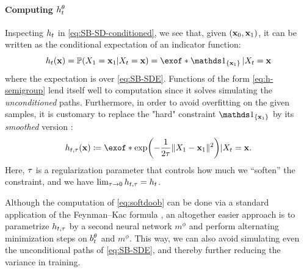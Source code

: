 \paragraph{Computing $h_t^\theta$}%

Inspecting $h_t$ in \eqref{eq:SB-SD-conditioned}, we see that, given $(\mathbf{x}_0,\mathbf{x}_1)$, it can be written as the conditional expectation of an indicator function:
\begin{equation}
\label{eq:h-semigroup}
\doob(\x) = \prob(X_1 = \x_1\vert X_t = \x) = \exof*{
\one_{\{\x_1\}}\vert X_t = \x}
\end{equation}where the expectation is over \eqref{eq:SB-SDE}. Functions of the form \eqref{eq:h-semigroup} lend itself well to computation since it solves simulating the \emph{unconditioned} paths.
Furthermore, in order to avoid overfitting on the given samples, it is customary to replace the "hard" constraint $\one_{\{\x_1\}}$ by its \emph{smoothed} version \citep{zhang2021path, holdijk2022path}: 
\begin{equation}
\label{eq:softdoob}
\doobs(\x) \defeq \exof*{  \exp\parens*{-\frac{1}{2\reg}\norm{X_\horizon-\x_1}^2 }  \vert X_t = \x}.
\end{equation}Here, $\tau$ is a regularization parameter that controls how much we ``soften'' the constraint, and we have $\lim_{\tau\to 0} h_{t,\tau} = h_t$.


Although the computation of \eqref{eq:softdoob} can be done via a standard application of the Feynman–Kac formula \citep{rogers2000diffusions}, an altogether easier approach is to parametrize $h_{t,\tau}$ by a second neural network $m^{\phi}$ and perform alternating minimization steps on $b_t^\theta$ and $m^{\phi}$. This way, we can also avoid simulating even the unconditional paths of \eqref{eq:SB-SDE}, and thereby further reducing the variance in training.


